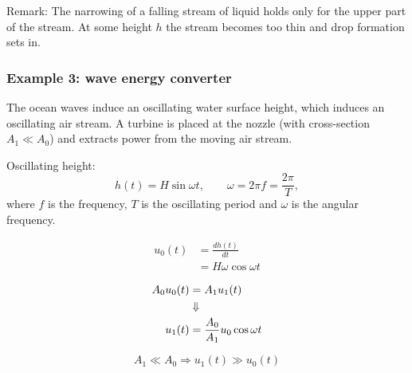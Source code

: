 \begin{framed}
Remark: The narrowing of a falling stream of liquid holds only for the upper part of the stream. At some height $h$ the stream becomes too thin and drop formation sets in.
\end{framed}


\subsubsection{Example 3: wave energy converter}
The ocean waves induce an oscillating water surface height, which induces an oscillating air stream. A turbine is placed at the nozzle (with cross-section $A_1\ll A_0$) and extracts power from the moving air stream.

Oscillating height:
\begin{equation}
    h(t) = H \sin \omega t, \qquad \omega = 2\pi f = \frac{2\pi}{T},
    \label{}
\end{equation}
where $f$ is the frequency, $T$ is the oscillating period and $\omega$ is the angular frequency.

\begin{align}
    u_0(t) &= \frac{dh(t)}{dt}\\
    &= H\omega \cos \omega t
    \label{}
\end{align}

\begin{align}
    A_0 u_0(t) &= A_1u_1(t)\\
    &\Downarrow\notag\\
    u_1(t) &= \frac{A_0}{A_1}u_0 \cos \omega t
    \label{}
\end{align}

\begin{equation}
    A_1 \ll A_0 \Rightarrow u_1(t) \gg u_0(t)
    \label{}
\end{equation}


